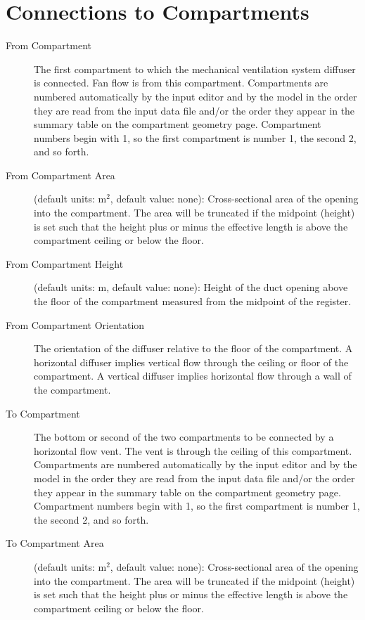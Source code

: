 \section{Connections to Compartments}

\begin{description}
\item[From Compartment] The first compartment to which the mechanical ventilation system diffuser is connected. Fan flow is from this compartment.  Compartments are numbered automatically by the input editor and by the model in the order they are read from the input data file and/or the order they appear in the summary table on the compartment geometry page. Compartment numbers begin with 1, so the first compartment is number 1, the second 2, and so forth.

\item[From Compartment Area] (default units: m$^2$, default value: none): Cross-sectional area of the opening into the compartment. The area will be truncated if the midpoint (height) is set such that the height plus or minus the effective length is above the compartment ceiling or below the floor.

\item[From Compartment Height] (default units: m, default value: none): Height of the duct opening above the floor of the compartment measured from the midpoint of the register.

\item[From Compartment Orientation] The orientation of the diffuser relative to the floor of the compartment.  A horizontal diffuser implies vertical flow through the ceiling or floor of the compartment.  A vertical diffuser implies horizontal flow through a wall of the compartment.

\item[To Compartment] The bottom or second of the two compartments to be connected by a horizontal flow vent. The vent is through the ceiling of this compartment. Compartments are numbered automatically by the input editor and by the model in the order they are read from the input data file and/or the order they appear in the summary table on the compartment geometry page. Compartment numbers begin with 1, so the first compartment is number 1, the second 2, and so forth.

\item[To Compartment Area] (default units: m$^2$, default value: none): Cross-sectional area of the opening into the compartment. The area will be truncated if the midpoint (height) is set such that the height plus or minus the effective length is above the compartment ceiling or below the floor.


\end{description}

